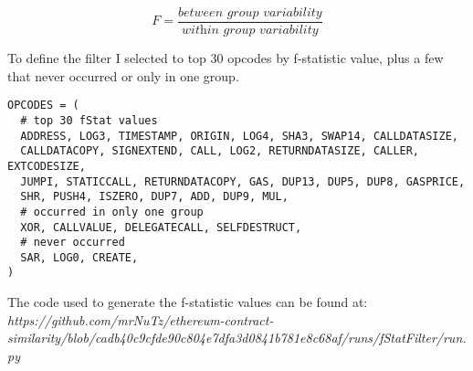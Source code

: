 \documentclass[../main.tex]{subfiles}
\begin{document}
\begin{equation}
  F = \dfrac{\textit{between group variability}}{\textit{within group variability}}
  \label{eq:ftest}
\end{equation}

To define the  filter I selected to top 30 opcodes by f-statistic value, plus a few that never occurred or only in one group.

\begin{lstlisting}[style=pymd]
OPCODES = (
  # top 30 fStat values
  ADDRESS, LOG3, TIMESTAMP, ORIGIN, LOG4, SHA3, SWAP14, CALLDATASIZE,
  CALLDATACOPY, SIGNEXTEND, CALL, LOG2, RETURNDATASIZE, CALLER, EXTCODESIZE,
  JUMPI, STATICCALL, RETURNDATACOPY, GAS, DUP13, DUP5, DUP8, GASPRICE,
  SHR, PUSH4, ISZERO, DUP7, ADD, DUP9, MUL,
  # occurred in only one group
  XOR, CALLVALUE, DELEGATECALL, SELFDESTRUCT,
  # never occurred
  SAR, LOG0, CREATE,
)
\end{lstlisting}

The code used to generate the f-statistic values can be found at: \textit{https://github.com/mrNuTz/ethereum-contract-similarity/blob/cadb40c9cfde90c804e7dfa3d0841b781e8c68af/runs/fStatFilter/run.py}
\end{document}
